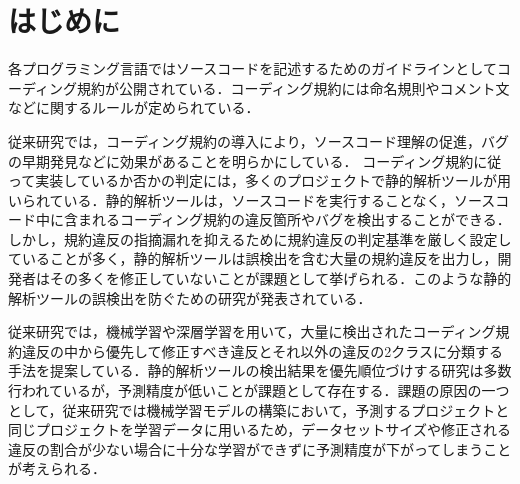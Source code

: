 \documentclass[T,J]{fose} %
\newcommand{\todo}[1]{\colorbox{yellow}{{\bf TODO}:}{\color{red} {\textbf{[#1]}}}}
\begin{document}
\section{はじめに}


各プログラミング言語ではソースコードを記述するためのガイドラインとしてコーディング規約が公開されている．コーディング規約には命名規則やコメント文などに関するルールが定められている．

従来研究では，コーディング規約の導入により，ソースコード理解の促進，バグの早期発見などに効果があることを明らかにしている\cite{Johnson}．
コーディング規約に従って実装しているか否かの判定には，多くのプロジェクトで静的解析ツールが用いられている．静的解析ツールは，ソースコードを実行することなく，ソースコード中に含まれるコーディング規約の違反箇所やバグを検出することができる．しかし，規約違反の指摘漏れを抑えるために規約違反の判定基準を厳しく設定していることが多く，静的解析ツールは誤検出を含む大量の規約違反を出力し，開発者はその多くを修正していないことが課題として挙げられる．このような静的解析ツールの誤検出を防ぐための研究が発表されている\cite{Nguyen}．

従来研究では，機械学習や深層学習を用いて，大量に検出されたコーディング規約違反の中から優先して修正すべき違反とそれ以外の違反の2クラスに分類する手法を提案している\cite{Qing}．静的解析ツールの検出結果を優先順位づけする研究は多数行われているが，予測精度が低いことが課題として存在する．課題の原因の一つとして，従来研究では機械学習モデルの構築において，予測するプロジェクトと同じプロジェクトを学習データに用いるため，データセットサイズや修正される違反の割合が少ない場合に十分な学習ができずに予測精度が下がってしまうことが考えられる．
\end{document}
